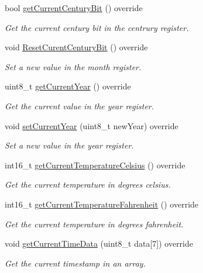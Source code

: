\begin{DoxyCompactItemize}
bool \mbox{\hyperlink{class_d_s3231_a38dfc1567d3419d5aeecd2062d4121c7}{get\+Current\+Century\+Bit}} () override
\begin{DoxyCompactList}\small\item\em Get the current century bit in the centrury register. \end{DoxyCompactList}\item 
void \mbox{\hyperlink{class_d_s3231_a6477bd1bb91d3df6a088c369692f46a3}{Reset\+Curent\+Century\+Bit}} () override
\begin{DoxyCompactList}\small\item\em Set a new value in the month register. \end{DoxyCompactList}\item 
uint8\+\_\+t \mbox{\hyperlink{class_d_s3231_a28a340b10b045ad1e8b94532a57c3759}{get\+Current\+Year}} () override
\begin{DoxyCompactList}\small\item\em Get the current value in the year register. \end{DoxyCompactList}\item 
void \mbox{\hyperlink{class_d_s3231_a59a60a725581bc8e5dcf857ea52c6281}{set\+Current\+Year}} (uint8\+\_\+t new\+Year) override
\begin{DoxyCompactList}\small\item\em Set a new value in the year register. \end{DoxyCompactList}\item 
int16\+\_\+t \mbox{\hyperlink{class_d_s3231_abd46c1cf5f5c78e3222c3677e70a1272}{get\+Current\+Temperature\+Celsius}} () override
\begin{DoxyCompactList}\small\item\em Get the current temperature in degrees celsius. \end{DoxyCompactList}\item 
int16\+\_\+t \mbox{\hyperlink{class_d_s3231_aa31acb133cc63aa7a2a25eda6244c9df}{get\+Current\+Temperature\+Fahrenheit}} () override
\begin{DoxyCompactList}\small\item\em Get the current temperature in degrees fahrenheit. \end{DoxyCompactList}\item 
void \mbox{\hyperlink{class_d_s3231_a0ca41c2242367c5ff1424d1b12f909c5}{get\+Current\+Time\+Data}} (uint8\+\_\+t data\mbox{[}7\mbox{]}) override
\begin{DoxyCompactList}\small\item\em Get the current timestamp in an array. \end{DoxyCompactList}\item 

\end{DoxyCompactItemize}
